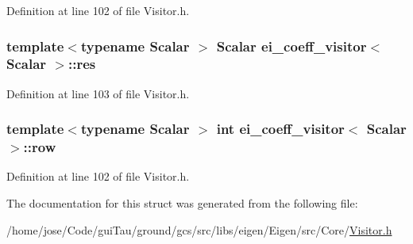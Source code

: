 Definition at line 102 of file Visitor.\-h.

\hypertarget{structei__coeff__visitor_a46146b8d6e43d1df63b5dfd196e13b9a}{
\subsubsection[{res}]{\setlength{\rightskip}{0pt plus 5cm}template$<$typename Scalar $>$ Scalar {\bf ei\-\_\-coeff\-\_\-visitor}$<$ Scalar $>$\-::{\bf res}}}\label{structei__coeff__visitor_a46146b8d6e43d1df63b5dfd196e13b9a}


Definition at line 103 of file Visitor.\-h.

\hypertarget{structei__coeff__visitor_a841642cd3a1185073276dbb458a9031e}{
\subsubsection[{row}]{\setlength{\rightskip}{0pt plus 5cm}template$<$typename Scalar $>$ {\bf int} {\bf ei\-\_\-coeff\-\_\-visitor}$<$ Scalar $>$\-::{\bf row}}}\label{structei__coeff__visitor_a841642cd3a1185073276dbb458a9031e}


Definition at line 102 of file Visitor.\-h.



The documentation for this struct was generated from the following file\-:\begin{DoxyCompactItemize}
\item 
/home/jose/\-Code/gui\-Tau/ground/gcs/src/libs/eigen/\-Eigen/src/\-Core/\hyperlink{_visitor_8h}{Visitor.\-h}\end{DoxyCompactItemize}
